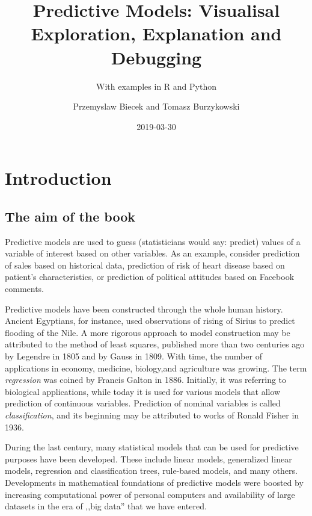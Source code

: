 \documentclass[]{krantz}
\title{Predictive Models: Visualisal Exploration, Explanation and Debugging}
\subtitle{With examples in R and Python}
\author{Przemyslaw Biecek and Tomasz Burzykowski}
\date{2019-03-30}
\theoremstyle{definition}
\theoremstyle{definition}
\theoremstyle{definition}
\theoremstyle{remark}
\begin{document}
\maketitle

{
\hypersetup{linkcolor=black}
\setcounter{tocdepth}{2}
\tableofcontents
}
\listoftables
\listoffigures
\hypertarget{introduction}{%
\section{Introduction}\label{introduction}}

\hypertarget{the-aim-of-the-book}{%
\subsection{The aim of the book}\label{the-aim-of-the-book}}

Predictive models are used to guess (statisticians would say: predict)
values of a variable of interest based on other variables. As an
example, consider prediction of sales based on historical data,
prediction of risk of heart disease based on patient's characteristics,
or prediction of political attitudes based on Facebook comments.

Predictive models have been constructed through the whole human history.
Ancient Egyptians, for instance, used observations of rising of Sirius
to predict flooding of the Nile. A more rigorous approach to model
construction may be attributed to the method of least squares, published
more than two centuries ago by Legendre in 1805 and by Gauss in 1809.
With time, the number of applications in economy, medicine, biology,and
agriculture was growing. The term \emph{regression} was coined by
Francis Galton in 1886. Initially, it was referring to biological
applications, while today it is used for various models that allow
prediction of continuous variables. Prediction of nominal variables is
called \emph{classification}, and its beginning may be attributed to
works of Ronald Fisher in 1936.

During the last century, many statistical models that can be used for
predictive purposes have been developed. These include linear models,
generalized linear models, regression and classification trees,
rule-based models, and many others. Developments in mathematical
foundations of predictive models were boosted by increasing
computational power of personal computers and availability of large
datasets in the era of ,,big data'' that we have entered.
\end{document}

